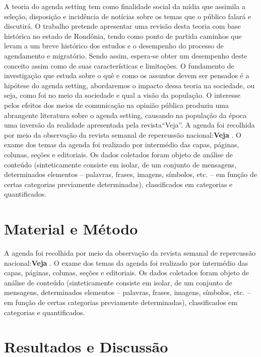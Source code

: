 \documentclass[article,12pt,onesidea,4paper,english,brazil]{abntex2}
\begin{document}
A teoria do agenda setting tem como finalidade social da mídia que assimila a seleção, disposição e incidência de notícias sobre os temas que o público falará e discutirá. O trabalho pretende apresentar uma revisão desta teoria com base histórica no estado de Rondônia, tendo como ponto de partida caminhos que levam a um breve histórico dos estudos e o desempenho do processo de agendamento e migratório. Sendo assim, espera-se obter um desempenho deste conceito assim como de suas características e limitações. O fundamento de investigação que estuda sobre  o  quê  e  como  os  assuntos  devem  ser  pensados  é  a  hipótese  do agenda setting, abordaremos o impacto dessa teoria na sociedade, ou seja, como foi no meio da sociedade e qual a visão da população. O interesse pelos efeitos dos meios de comunicação na opinião pública produziu uma abrangente literatura sobre o agenda setting, causando na população da época uma inversão da realidade apresentada pela revista“Veja”.
A agenda foi recolhida por meio da observação da revista semanal de repercussão nacional:\textbf{Veja} . O exame dos temas da agenda foi realizado por intermédio das capas, páginas, colunas, seções e editoriais. Os dados coletados foram objeto de análise de conteúdo (sinteticamente consiste em isolar, de um conjunto de mensagens, determinados elementos – palavras, frases, imagens, símbolos, etc. – em função de certas categorias previamente determinadas), classificados em categorias e quantificados.
	
	\section*{Material e Método}
	
	A agenda foi recolhida por meio da observação da revista semanal de repercussão nacional:\textbf{Veja} . O exame dos temas da agenda foi realizado por intermédio das capas, páginas, colunas, seções e editoriais. Os dados coletados foram objeto de análise de conteúdo (sinteticamente consiste em isolar, de um conjunto de mensagens, determinados elementos – palavras, frases, imagens, símbolos, etc. – em função de certas categorias previamente determinadas), classificados em categorias e quantificados.
	
	\section*{Resultados e Discussão}
	
\end{document}
